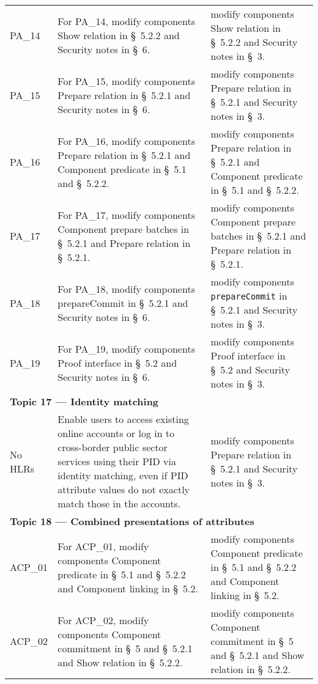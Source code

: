 \begin{landscape}
\begin{longtable}{p{3cm} p{10cm} p{7cm}}
PA\_14 &
For PA\_14, modify components Show relation in \S~5.2.2 and Security notes in \S~6. &
modify components Show relation in \S~5.2.2 and Security notes in \S~3. \\

PA\_15 &
For PA\_15, modify components Prepare relation in \S~5.2.1 and Security notes in \S~6. &
modify components Prepare relation in \S~5.2.1 and Security notes in \S~3. \\

PA\_16 &
For PA\_16, modify components Prepare relation in \S~5.2.1 and Component predicate in \S~5.1 and \S~5.2.2. &
modify components Prepare relation in \S~5.2.1 and Component predicate in \S~5.1 and \S~5.2.2. \\

PA\_17 &
For PA\_17, modify components Component prepare batches in \S~5.2.1 and Prepare relation in \S~5.2.1. &
modify components Component prepare batches in \S~5.2.1 and Prepare relation in \S~5.2.1. \\

PA\_18 &
For PA\_18, modify components prepareCommit in \S~5.2.1 and Security notes in \S~6. &
modify components \texttt{prepareCommit} in \S~5.2.1 and Security notes in \S~3. \\

PA\_19 &
For PA\_19, modify components Proof interface in \S~5.2 and Security notes in \S~6. &
modify components Proof interface in \S~5.2 and Security notes in \S~3. \\[1em]


\multicolumn{3}{l}{\textbf{Topic 17 — Identity matching}}\\

No HLRs &
Enable users to access existing online accounts or log in to cross-border public sector services using their PID via identity matching, even if PID attribute values do not exactly match those in the accounts. &
modify components Prepare relation in \S~5.2.1 and Security notes in \S~3. \\[2em]


\multicolumn{3}{l}{\textbf{Topic 18 — Combined presentations of attributes}}\\

ACP\_01 &
For ACP\_01, modify components Component predicate in \S~5.1 and \S~5.2.2 and Component linking in \S~5.2. &
modify components Component predicate in \S~5.1 and \S~5.2.2 and Component linking in \S~5.2. \\

ACP\_02 &
For ACP\_02, modify components Component commitment in \S~5 and \S~5.2.1 and Show relation in \S~5.2.2. &
modify components Component commitment in \S~5 and \S~5.2.1 and Show relation in \S~5.2.2. \\


\end{longtable}
\end{landscape}
